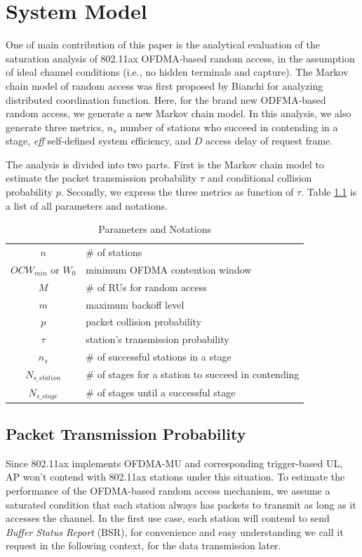 \chapter{System Model} 		\label{sec_sys_model}
One of main contribution of this paper is the analytical evaluation of the saturation analysis of 802.11ax OFDMA-based random access, in the assumption of ideal channel conditions (i.e., no hidden terminals and capture). 
The Markov chain model of random access was first proposed by Bianchi for analyzing distributed coordination function\cite{bianchi2000performance}. 
Here, for the brand new ODFMA-based random access, we generate a new Markov chain model. 
In this analysis, we also generate three metrics, $n_s$ number of stations who succeed in contending in a stage, \textit{eff} self-defined system efficiency, and $D$ access delay of request frame. 

The analysis is divided into two parts. First is the Markov chain model to estimate the packet transmission probability $\tau$ and conditional collision probability $p$. 
Secondly, we express the three metrics as function of $\tau$. 
Table \ref{table_notation} is a list of all parameters and notations.

\begin{table}[!h]
\caption{Parameters and Notations}
\centering
\label{table_notation}
\begin{tabular}{c|l}
\hline
$n$						& $\#$ of stations \\
$OCW_{min}$ or $W_0$		& minimum OFDMA contention window \\
$M$						& $\#$ of RUs for random access \\
$m$						& maximum backoff level \\
$p$						& packet collision probability \\
$\tau$					& station's transmission probability \\
$n_s$					& $\#$ of successful stations in a stage \\
$N_{s\_station}$			& $\#$ of stages for a station to succeed in contending \\
$N_{s\_stage}$			& $\#$ of stages until a successful stage \\
\hline
\end{tabular}
\end{table}

\section{Packet Transmission Probability}
Since 802.11ax implements OFDMA-MU and corresponding trigger-based UL, AP won't contend with 802.11ax stations under this situation.
To estimate the performance of the OFDMA-based random access mechanism, we assume a saturated condition that each station always has packets to transmit as long as it accesses the channel.
In the first use case, each station will contend to send \textit{Buffer Status Report} (BSR), for convenience and easy understanding we call it request in the following context, for the data transmission later. 

